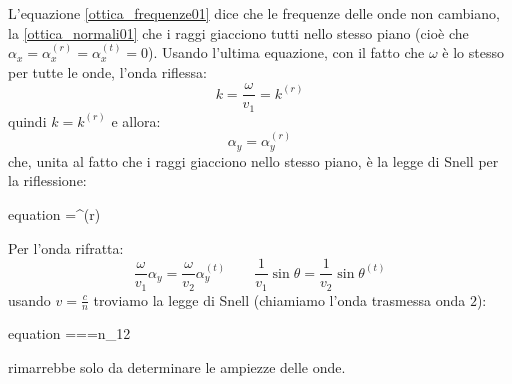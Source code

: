 L'equazione \eqref{ottica_frequenze01} dice che le frequenze delle onde non cambiano, la \eqref{ottica_normali01} che i raggi giacciono tutti nello stesso piano (cioè che $\alpha_x=\alpha_x^{(r)}=\alpha_x^{(t)}=0$). Usando l'ultima equazione, con il fatto che $\omega$ è lo stesso per tutte le onde, l'onda riflessa:
\[
 k=\frac{\omega}{v_1}=k^{(r)}
\]
quindi $k=k^{(r)}$ e allora:
\[
\alpha_y = \alpha_y^{(r)}
\]
che, unita al fatto che i raggi giacciono nello stesso piano, è la legge di Snell per la riflessione:
\begin{eqimp}{equation}
\theta=\theta^{(r)}
\end{eqimp}
Per l'onda rifratta:
\[
\frac{\omega}{v_1}\alpha_y=\frac{\omega}{v_2}\alpha_y^{(t)}
\qquad
\frac{1}{v_1}\sin\theta=\frac{1}{v_2}\sin\theta^{(t)}
\]
usando $v=\frac{c}{n}$ troviamo la legge di Snell (chiamiamo l'onda trasmessa onda $2$):
\begin{eqimp}{equation}
===n_{12}
\end{eqimp}
rimarrebbe solo da determinare le ampiezze delle onde.


